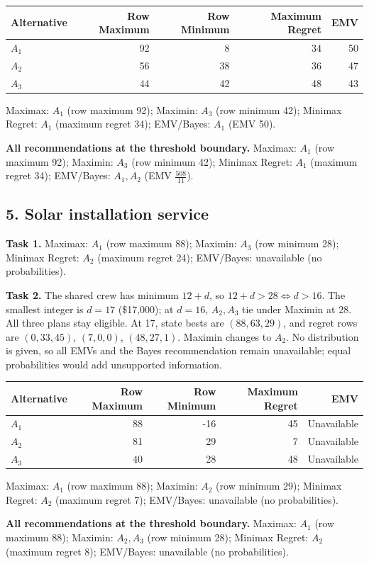 \begin{center}\begin{tabular}{lrrrr}\toprule Alternative & Row Maximum & Row Minimum & Maximum Regret & EMV\\\midrule
$A_1$ & 92 & 8 & 34 & 50\\
$A_2$ & 56 & 38 & 36 & 47\\
$A_3$ & 44 & 42 & 48 & 43\\
\bottomrule\end{tabular}\end{center}
Maximax: $A_1$ (row maximum 92); Maximin: $A_3$ (row minimum 42); Minimax Regret: $A_1$ (maximum regret 34); EMV/Bayes: $A_1$ (EMV 50).

\textbf{All recommendations at the threshold boundary.} Maximax: $A_1$ (row maximum 92); Maximin: $A_3$ (row minimum 42); Minimax Regret: $A_1$ (maximum regret 34); EMV/Bayes: $A_1,A_2$ (EMV $\frac{508}{11}$).
\newpage
\subsection*{5. Solar installation service}
\textbf{Task 1.} Maximax: $A_1$ (row maximum 88); Maximin: $A_3$ (row minimum 28); Minimax Regret: $A_2$ (maximum regret 24); EMV/Bayes: unavailable (no probabilities).

\textbf{Task 2.} The shared crew has minimum $12+d$, so $12+d>28\iff d>16$. The smallest integer is $d=17$ (\$17,000); at $d=16$, $A_2,A_3$ tie under Maximin at 28. All three plans stay eligible. At 17, state bests are $(88,63,29)$, and regret rows are $(0,33,45)$, $(7,0,0)$, $(48,27,1)$. Maximin changes to $A_2$. No distribution is given, so all EMVs and the Bayes recommendation remain unavailable; equal probabilities would add unsupported information.

\begin{center}\begin{tabular}{lrrrr}\toprule Alternative & Row Maximum & Row Minimum & Maximum Regret & EMV\\\midrule
$A_1$ & 88 & -16 & 45 & Unavailable\\
$A_2$ & 81 & 29 & 7 & Unavailable\\
$A_3$ & 40 & 28 & 48 & Unavailable\\
\bottomrule\end{tabular}\end{center}
Maximax: $A_1$ (row maximum 88); Maximin: $A_2$ (row minimum 29); Minimax Regret: $A_2$ (maximum regret 7); EMV/Bayes: unavailable (no probabilities).

\textbf{All recommendations at the threshold boundary.} Maximax: $A_1$ (row maximum 88); Maximin: $A_2,A_3$ (row minimum 28); Minimax Regret: $A_2$ (maximum regret 8); EMV/Bayes: unavailable (no probabilities).

